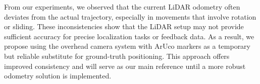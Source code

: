 From our experiments, we observed that the current LiDAR odometry often deviates from the actual trajectory, especially in movements that involve rotation or sliding. These inconsistencies show that the LiDAR setup may not provide sufficient accuracy for precise localization tasks or feedback data. As a result, we propose using the overhead camera system with ArUco markers as a temporary but reliable substitute for ground-truth positioning. This approach offers improved consistency and will serve as our main reference until a more robust odometry solution is implemented.
